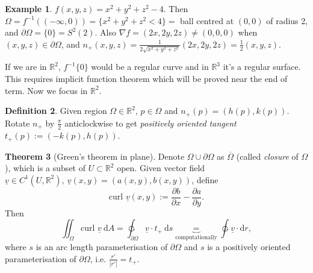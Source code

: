 \documentclass[a4paper]{article}
\theoremstyle{definition}
\newcommand{\curl}{\text{curl }}
\newtheorem{defn}{Definition}[subsection]
\newtheorem{thm}[defn]{Theorem}
\newtheorem{eg}[defn]{Example}
\begin{document}
\begin{eg}
$f(x,y,z) = x^2+y^2+z^2-4$. Then $\Omega = f^{-1} ((-\infty,0)) = \{x^2+y^2+z^2 <4\}=$ ball centred at $(0,0)$ of radius 2, and $\partial \Omega = \{0\}=S^2(2).$ Also $\nabla f = (2x,2y,2z) \neq (0,0,0)$ when $(x,y,z) \in \partial \Omega$, and $n_+ (x,y,z) = \frac1{2\sqrt{x^2+y^2+z^2}} (2x,2y,2z) = \frac12 (x,y,z)$.
\end{eg}

If we are in $\mathbb R^2$, $f^{-1}\{0\}$ would be a regular curve and in $\mathbb R^3$ it's a regular surface. This requires implicit function theorem which will be proved near the end of term. Now we focus in $\mathbb R^2$.

\begin{defn}
Given region $\Omega \in \mathbb R^2$, $p\in \Omega$ and $n_+ (p) = (h(p),k(p)).$ Rotate $n_+$ by $\frac{\pi}{2}$ anticlockwise to get \textit{positively oriented tangent} $t_+(p):=(-k(p),h(p))$.
\end{defn}

\begin{thm}[Green's theorem in plane]
Denote $\Omega \cup \partial \Omega$ as $\overline{\Omega}$ (called \textit{closure} of $\Omega$), which is a subset of $U\subset \mathbb R^2$ open. Given vector field $\underline v \in C^1 (U,\mathbb R^2),\ \underline v(x,y) = \left(a(x,y),b(x,y)\right)$, define
\[
\curl \underline v (x,y) := \frac{\partial b}{\partial x}-\frac{\partial a}{\partial y}.
\]
Then
\[
\iint_\Omega \curl \underline v \ \mathrm d A = \ointctrclockwise_{\partial \Omega} \underline v \cdot t_+ \ \mathrm d s \underbrace{=}_{\text{computationally}} \ointctrclockwise \underline v \cdot \mathrm d r,
\]
where $s$ is an arc length parameterisation of $\partial \Omega$ and $s$ is a positively oriented parameterisation of $\partial \Omega$, i.e. $\frac{r'}{|r'|} = t_+$.
\end{thm}
\end{document}

